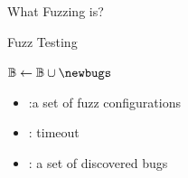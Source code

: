 \documentclass[10pt,aspectratio=43]{beamer}
\begin{document}
\begin{frame}[fragile] {What Fuzzing is?}
{\begin{block}{Fuzz Testing}
\begin{minipage}[t]{0.65\linewidth}
\begin{algorithm}[H]
{              $\bugs \gets \bugs \cup \newbugs$\;
            }
            \Return{\bugs}\;
        \end{algorithm} 
        \end{minipage} 
        \begin{minipage}[t]{0.34\linewidth}
            {
                \vspace{25pt}
                \centering
                \scriptsize{
                    \begin{itemize}  
                        \item  \confs :a set of fuzz configurations
                        \item  \timeout: timeout
                        \item  \bugs: a set of discovered bugs
                    \end{itemize} 
                }
            }
        \end{minipage}
        \end{block}
    }  


\end{frame}
\end{document}
